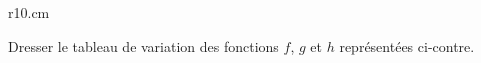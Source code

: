 
\begin{exercice}\label{exoSeconde-0072}


\begin{wrapfigure}{r}{10.cm}
   \vspace{-2cm}        %
   \centering
   
\end{wrapfigure}

    Dresser le tableau de variation des fonctions \( f\), \( g\) et \( h\) représentées ci-contre.

\end{exercice}
